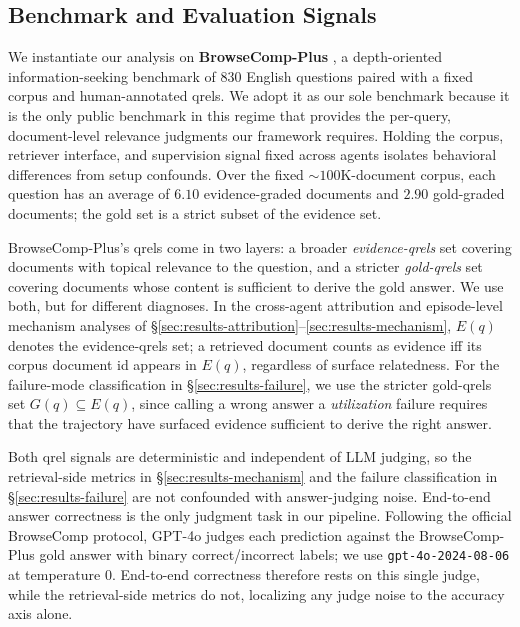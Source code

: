 \subsection{Benchmark and Evaluation Signals}
\label{sec:signals}
\label{sec:impl}

We instantiate our analysis on \textbf{BrowseComp-Plus} \citep{Chen2025BrowseComp-PlusAMore}, a depth-oriented information-seeking benchmark of $830$ English questions paired with a fixed corpus and human-annotated qrels. We adopt it as our sole benchmark because it is the only public benchmark in this regime that provides the per-query, document-level relevance judgments our framework requires. Holding the corpus, retriever interface, and supervision signal fixed across agents isolates behavioral differences from setup confounds. Over the fixed ${\sim}100$K-document corpus, each question has an average of $6.10$ evidence-graded documents and $2.90$ gold-graded documents; the gold set is a strict subset of the evidence set.

BrowseComp-Plus's qrels come in two layers: a broader \emph{evidence-qrels} set covering documents with topical relevance to the question, and a stricter \emph{gold-qrels} set covering documents whose content is sufficient to derive the gold answer. We use both, but for different diagnoses. In the cross-agent attribution and episode-level mechanism analyses of §\ref{sec:results-attribution}--\ref{sec:results-mechanism}, $E(q)$ denotes the evidence-qrels set; a retrieved document counts as evidence iff its corpus document id appears in $E(q)$, regardless of surface relatedness. For the failure-mode classification in §\ref{sec:results-failure}, we use the stricter gold-qrels set $G(q) \subseteq E(q)$, since calling a wrong answer a \emph{utilization} failure requires that the trajectory have surfaced evidence sufficient to derive the right answer.

Both qrel signals are deterministic and independent of LLM judging, so the retrieval-side metrics in §\ref{sec:results-mechanism} and the failure classification in §\ref{sec:results-failure} are not confounded with answer-judging noise. End-to-end answer correctness is the only judgment task in our pipeline. Following the official BrowseComp protocol, GPT-4o judges each prediction against the BrowseComp-Plus gold answer with binary correct/incorrect labels; we use \texttt{gpt-4o-2024-08-06} at temperature $0$. End-to-end correctness therefore rests on this single judge, while the retrieval-side metrics do not, localizing any judge noise to the accuracy axis alone.
